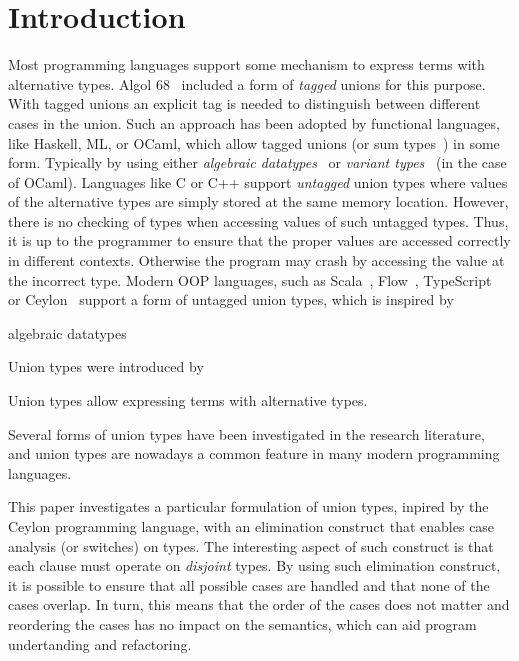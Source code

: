 \section{Introduction}
\label{sec:intro}

Most programming languages support some mechanism to express terms
with alternative types. Algol 68~\cite{} included a form of
\emph{tagged} unions for this purpose. With tagged unions
an explicit tag is needed to distinguish between different cases in the
union. Such an approach has been adopted by functional languages, like Haskell, ML, or
OCaml, which allow tagged unions (or sum types~\cite{}) in some form.
Typically by using either \emph{algebraic datatypes}~\cite{} or \emph{variant
  types}~\cite{} (in the case of OCaml).  Languages like C or C++ support \emph{untagged} union types where
values of the alternative types are simply stored at the same memory
location. However, there is no checking of types when accessing values of
such untagged types. Thus, it is up to the programmer to ensure that the proper
values are accessed correctly in different contexts. Otherwise the
program may crash by accessing the value at the incorrect type.
Modern OOP languages, such as Scala~\cite{}, Flow~\cite{},
TypeScript~\cite{} or Ceylon~\cite{} support a form
of untagged union types, which is inspired by 

algebraic datatypes 

Union types were introduced by 

Union types allow expressing terms with alternative types.


Several forms of
union types have been investigated in the research literature, and
union types are nowadays a common feature in many modern programming
languages.

This paper investigates a particular formulation of union types,
inpired by the Ceylon programming language, with an elimination
construct that enables case analysis (or switches) on types.  The
interesting aspect of such construct is that each clause must operate
on \emph{disjoint} types. By using such elimination construct, it is
possible to ensure that all possible cases are
handled and that none of the cases overlap. In turn, this means that
the order of the cases does not matter and reordering the cases has no
impact on the semantics, which can aid program undertanding and
refactoring.

